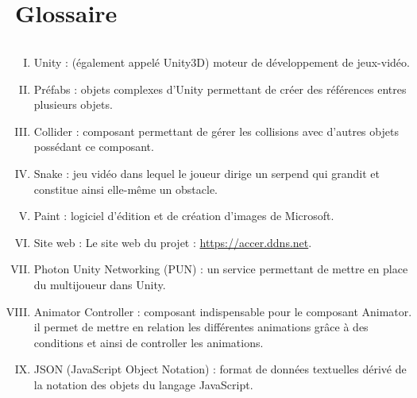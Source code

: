 \documentclass[titlepage, 13px, a4paper]{report}
\begin{document}


\part{Glossaire}
\paragraph*{} \hspace{0pt}
{\begin{enumerate}[I.]
	\item Unity : (également appelé Unity3D) moteur de développement de jeux-vidéo. \\
	
	\item Préfabs : objets complexes d'Unity permettant de créer des références 
	entres plusieurs objets. \\
	
	\item Collider : composant permettant de gérer les collisions avec d'autres objets 
	possédant ce composant.    \\

	\item Snake : jeu vidéo dans lequel le joueur dirige un serpend qui grandit et constitue 
	ainsi elle-même un obstacle.        \\

	\item Paint : logiciel d'édition et de création d'images de Microsoft.    \\

	\item Site web : Le site web du projet : \url{https://accer.ddns.net}.    \\

	\item Photon Unity Networking (PUN) : un service permettant de mettre en 
	place du multijoueur dans Unity. \\

	\item Animator Controller : composant indispensable pour le composant Animator.
		il permet de mettre en relation les différentes animations grâce à des conditions
		et ainsi de controller les animations.   \\

	\item JSON (JavaScript Object Notation) : format de données textuelles dérivé de la 
	notation des objets du langage JavaScript.    \\


\end{enumerate}}
\end{document}
